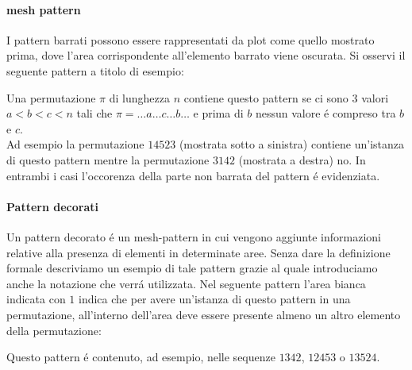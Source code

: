 \paragraph*{mesh pattern} I pattern barrati possono essere rappresentati da plot come quello mostrato prima, dove l'area corrispondente all'elemento barrato viene oscurata. Si osservi il seguente pattern a titolo di esempio:
\begin{center}\end{center}
Una permutazione $\pi$ di lunghezza $n$ contiene questo pattern se ci sono 3 valori $a<b<c<n$ tali che $\pi=\dots{a}\dots{c}\dots{b}\dots$ e prima di $b$ nessun valore \'e compreso tra $b$ e $c$.\\
Ad esempio la permutazione $14523$ (mostrata sotto a sinistra) contiene un'istanza di questo pattern mentre la permutazione $3142$ (mostrata a destra) no. In entrambi i casi l'occorenza della parte non barrata del pattern \'e evidenziata.
\begin{center}
\end{center}
\paragraph*{Pattern decorati}Un pattern decorato \'e un mesh-pattern in cui vengono aggiunte informazioni relative alla presenza di elementi in determinate aree. Senza dare la definizione formale descriviamo un esempio di tale pattern grazie al quale introduciamo anche la notazione che verr\'a utilizzata. Nel seguente pattern l'area bianca indicata con $1$ indica che per avere un'istanza di questo pattern in una permutazione, all'interno dell'area deve essere presente almeno un altro elemento della permutazione: 
\begin{center}
\end{center}
Questo pattern \'e contenuto, ad esempio, nelle sequenze $1342$, $12453$ o $13524$.
